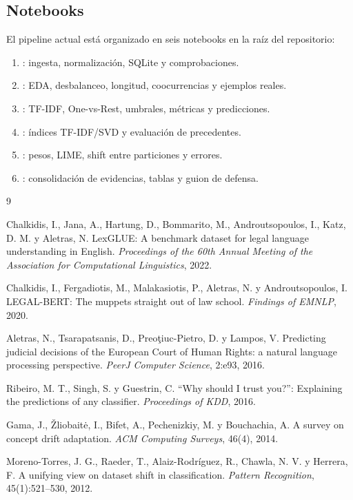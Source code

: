\documentclass[11pt,a4paper]{article}
\begin{document}
\subsection{Notebooks}

El pipeline actual está organizado en seis notebooks en la raíz del repositorio:

\begin{enumerate}
\item {}: ingesta, normalización, SQLite y comprobaciones.
\item {}: EDA, desbalanceo, longitud, coocurrencias y ejemplos reales.
\item {}: TF-IDF, One-vs-Rest, umbrales, métricas y predicciones.
\item {}: índices TF-IDF/SVD y evaluación de precedentes.
\item {}: pesos, LIME, shift entre particiones y errores.
\item {}: consolidación de evidencias, tablas y guion de defensa.
\end{enumerate}

\begin{thebibliography}{9}

Chalkidis, I., Jana, A., Hartung, D., Bommarito, M., Androutsopoulos, I., Katz, D. M. y Aletras, N.
\newblock LexGLUE: A benchmark dataset for legal language understanding in English.
\newblock \textit{Proceedings of the 60th Annual Meeting of the Association for Computational Linguistics}, 2022.

Chalkidis, I., Fergadiotis, M., Malakasiotis, P., Aletras, N. y Androutsopoulos, I.
\newblock LEGAL-BERT: The muppets straight out of law school.
\newblock \textit{Findings of EMNLP}, 2020.

Aletras, N., Tsarapatsanis, D., Preoţiuc-Pietro, D. y Lampos, V.
\newblock Predicting judicial decisions of the European Court of Human Rights: a natural language processing perspective.
\newblock \textit{PeerJ Computer Science}, 2:e93, 2016.

Ribeiro, M. T., Singh, S. y Guestrin, C.
\newblock ``Why should I trust you?'': Explaining the predictions of any classifier.
\newblock \textit{Proceedings of KDD}, 2016.

Gama, J., Žliobaitė, I., Bifet, A., Pechenizkiy, M. y Bouchachia, A.
\newblock A survey on concept drift adaptation.
\newblock \textit{ACM Computing Surveys}, 46(4), 2014.

Moreno-Torres, J. G., Raeder, T., Alaiz-Rodríguez, R., Chawla, N. V. y Herrera, F.
\newblock A unifying view on dataset shift in classification.
\newblock \textit{Pattern Recognition}, 45(1):521--530, 2012.

\end{thebibliography}
\end{document}
